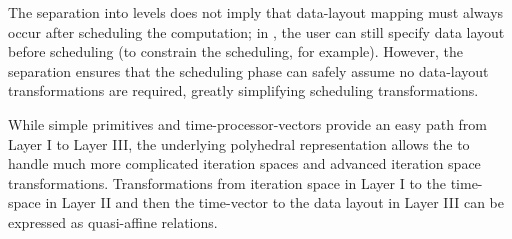 The separation into levels does not imply that data-layout mapping must always occur after scheduling the computation; in \framework, the user can still specify data layout before scheduling (to constrain the scheduling, for example). However, the separation ensures that the scheduling phase can safely assume no data-layout transformations are required, greatly simplifying scheduling transformations.


While simple primitives and time-processor-vectors provide an easy path from Layer I to Layer III,   
the underlying polyhedral representation  allows the \framework to handle much more complicated iteration spaces and advanced iteration space transformations.
Transformations from iteration space in Layer I to the time-\processor space in Layer II and then the time-\processor vector to the data layout in Layer III can be expressed as quasi-affine relations. %

